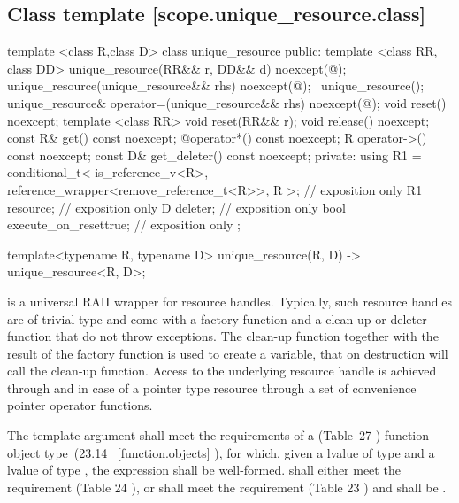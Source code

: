 \documentclass[ebook,11pt,article]{memoir}
\renewcommand{\iref}[1]{[#1]}
\begin{document}
\subsection {Class template  [scope.unique_resource.class]}

\begin{codeblock}
template <class R,class D>
class unique_resource {
public:
  template <class RR, class DD>
  unique_resource(RR&& r, DD&& d) noexcept(@\seebelow@);
  unique_resource(unique_resource&& rhs) noexcept(@\seebelow@);
  ~unique_resource();
  unique_resource& operator=(unique_resource&& rhs) noexcept(@\seebelow@);
  void reset() noexcept;
  template <class RR>
    void reset(RR&& r);
  void release() noexcept;
  const R& get() const noexcept;
  @\seebelow@ operator*() const noexcept;
  R operator->() const noexcept;  
  const D& get_deleter() const noexcept;
private:
  using R1 = conditional_t< is_reference_v<R>, 
               reference_wrapper<remove_reference_t<R>>, R >; // exposition only
  R1   resource; // exposition only
  D    deleter;  // exposition only
  bool execute_on_reset{true}; // exposition only
};

template<typename R, typename D>
  unique_resource(R, D) 
    -> unique_resource<R, D>;
\end{codeblock}

\pnum
\begin{note}
 is a universal RAII wrapper for resource handles.
Typically, such resource handles are of trivial type and come with a factory function and a clean-up or deleter function that do not throw exceptions.
The clean-up function together with the result of the factory function is used to create a  variable, that on destruction will call the clean-up function. Access to the underlying resource handle is achieved through  and in case of a pointer type resource through a set of convenience pointer operator functions.
\end{note}


\pnum 
\requires
The template argument
 shall meet the requirements of a 
(Table~27
) function object type~(23.14~
\iref{function.objects}
), 
for which, given
a lvalue  of type  and a lvalue
 of type , the expression
 shall be well-formed. %
 shall either meet the  requirement (Table 24
), or 
 shall meet the  requirement (Table 23
) and
 shall be .
\end{document}
